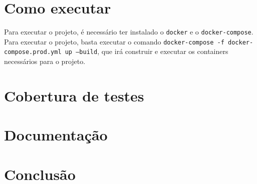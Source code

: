 \documentclass{article}
\begin{document}
\section{Como executar}

Para executar o projeto, é necessário ter instalado o \texttt{docker} e o \texttt{docker-compose}. Para executar o projeto, basta executar o comando \texttt{docker-compose -f docker-compose.prod.yml up --build}, que irá construir e executar os containers necessários para o projeto. 

\section{Cobertura de testes}

\section{Documentação}

\section{Conclusão}
\end{document}
